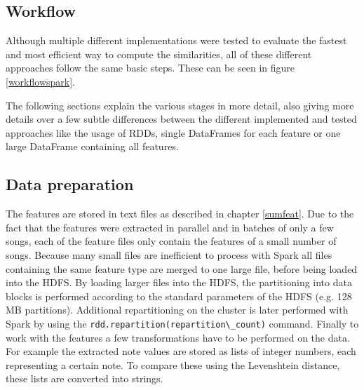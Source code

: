 \subsection{Workflow}

Although multiple different implementations were tested to evaluate the fastest and most efficient way to compute the similarities, all of these different approaches follow the same basic steps. These can be seen in figure \ref{workflowspark}.  

\begin{figure}[htbp]
	\centering
\end{figure}
\FloatBarrier

\noindent The following sections explain the various stages in more detail, also giving more details over a few subtle differences between the different implemented and tested approaches like the usage of RDDs, single DataFrames for each feature or one large DataFrame containing all features. 

\subsection{Data preparation}

The features are stored in text files as described in chapter \ref{sumfeat}. Due to the fact that the features were extracted in parallel and in batches of only a few songs, each of the feature files only contain the features of a small number of songs. Because many small files are inefficient to process with Spark \cite[p. 153]{sparkbook1} all files containing the same feature type are merged to one large file, before being loaded into the HDFS. By loading larger files into the HDFS, the partitioning into data blocks is performed according to the standard parameters of the HDFS (e.g. 128 MB partitions). Additional repartitioning on the cluster is later performed with Spark by using the \lstinline{rdd.repartition(repartition\_count)} command. 
Finally to work with the features a few transformations have to be performed on the data. For example the extracted note values are stored as lists of integer numbers, each representing a certain note. To compare these using the Levenshtein distance, these lists are converted into strings. 

